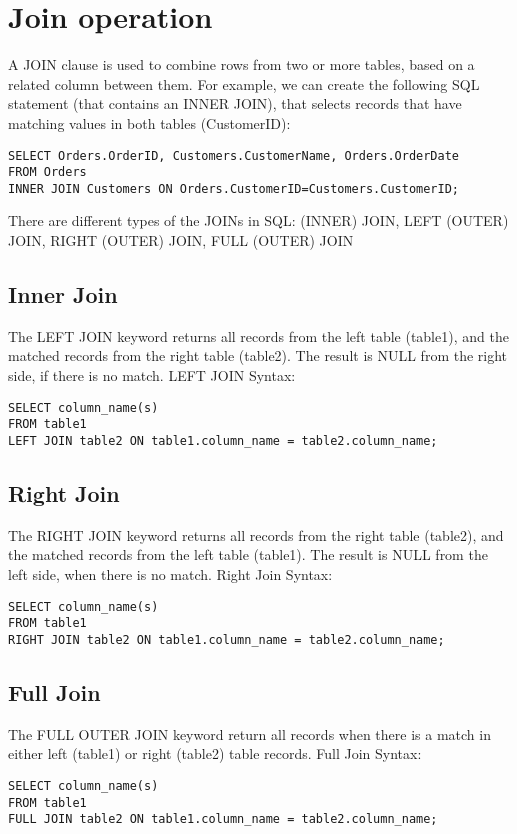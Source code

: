 \documentclass[a4paper]{article}
\begin{document}
    \section{Join operation}
    A JOIN clause is used to combine rows from two or more tables, based on a related column between them. For example, we can create the following SQL statement (that contains an INNER JOIN), that selects records that have matching values in both tables (CustomerID):
    \begin{verbatim}
SELECT Orders.OrderID, Customers.CustomerName, Orders.OrderDate
FROM Orders
INNER JOIN Customers ON Orders.CustomerID=Customers.CustomerID; 
    \end{verbatim}
    There are different types of the JOINs in SQL: (INNER) JOIN, LEFT (OUTER) JOIN, RIGHT (OUTER) JOIN, FULL (OUTER) JOIN
    \subsection{Inner Join}
    The LEFT JOIN keyword returns all records from the left table (table1), and the matched records from the right table (table2). The result is NULL from the right side, if there is no match.
    LEFT JOIN Syntax:
    \begin{verbatim}
SELECT column_name(s)
FROM table1
LEFT JOIN table2 ON table1.column_name = table2.column_name;
    \end{verbatim}
    \subsection{Right Join}
    The RIGHT JOIN keyword returns all records from the right table (table2), and the matched records from the left table (table1). The result is NULL from the left side, when there is no match.
    Right Join Syntax:
    \begin{verbatim}
SELECT column_name(s)
FROM table1
RIGHT JOIN table2 ON table1.column_name = table2.column_name;
    \end{verbatim}
    \subsection{Full Join}
    The FULL OUTER JOIN keyword return all records when there is a match in either left (table1) or right (table2) table records.
    Full Join Syntax:
    \begin{verbatim}
SELECT column_name(s)
FROM table1
FULL JOIN table2 ON table1.column_name = table2.column_name;
    \end{verbatim}
\end{document}
